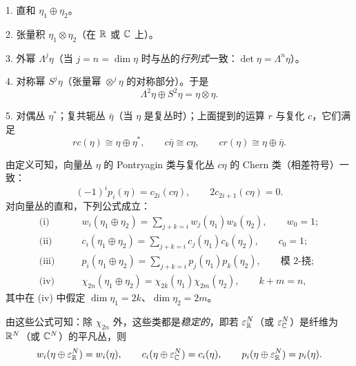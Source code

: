 1. 直和 $\eta_1\oplus\eta_2$。

2. 张量积 $\eta_1\otimes\eta_2$（在 $\mathbb{R}$ 或 $\mathbb{C}$ 上）。

3. 外幂 $\Lambda^j\eta$（当 $j=n=\dim\eta$ 时与丛的\emph{行列式}一致：$\det\eta=\Lambda^n\eta$）。

4. 对称幂 $S^j\eta$（张量幂 $\otimes^j\eta$ 的对称部分）。于是
\begin{equation}
\Lambda^2\eta\oplus S^2\eta=\eta\otimes\eta. \tag{1.29}
\end{equation}

5. 对偶丛 $\eta^*$；复共轭丛 $\bar\eta$（当 $\eta$ 是复丛时）；上面提到的运算 $r$ 与复化 $c$，它们满足
\begin{equation}
rc(\eta)\cong\eta\oplus\eta^*,\qquad c\bar\eta\cong c\eta,\qquad cr(\eta)\cong\eta\oplus\bar\eta. \tag{1.30}
\end{equation}

由定义可知，向量丛 $\eta$ 的 Pontryagin 类与复化丛 $c\eta$ 的 Chern 类（相差符号）一致：
\begin{equation}
(-1)^ip_i(\eta)=c_{2i}(c\eta),\qquad 2c_{2i+1}(c\eta)=0. \tag{1.31}
\end{equation}
对向量丛的直和，下列公式成立：
\begin{equation}
\begin{aligned}
\text{(i)}&\qquad w_i(\eta_1\oplus\eta_2)=\sum_{j+k=i}w_j(\eta_1)w_k(\eta_2),\qquad w_0=1;\\
\text{(ii)}&\qquad c_i(\eta_1\oplus\eta_2)=\sum_{j+k=i}c_j(\eta_1)c_k(\eta_2),\qquad c_0=1;\\
\text{(iii)}&\qquad p_i(\eta_1\oplus\eta_2)=\sum_{j+k=i}p_j(\eta_1)p_k(\eta_2),\qquad \text{模 2-挠};\\
\text{(iv)}&\qquad \chi_{2n}(\eta_1\oplus\eta_2)=\chi_{2k}(\eta_1)\chi_{2m}(\eta_2),\qquad k+m=n,
\end{aligned}\tag{1.32}
\end{equation}
其中在 (iv) 中假定 $\dim\eta_1=2k$、$\dim\eta_2=2m$。

由这些公式可知：除 $\chi_{2n}$ 外，这些类都是\emph{稳定的}，即若 $\varepsilon_{\mathbb{R}}^N$（或 $\varepsilon_{\mathbb{C}}^N$）是纤维为 $\mathbb{R}^N$（或 $\mathbb{C}^N$）的平凡丛，则
\[
w_i(\eta\oplus\varepsilon_{\mathbb{R}}^N)=w_i(\eta),\qquad c_i(\eta\oplus\varepsilon_{\mathbb{C}}^N)=c_i(\eta),\qquad p_i(\eta\oplus\varepsilon_{\mathbb{R}}^N)=p_i(\eta).
\]


